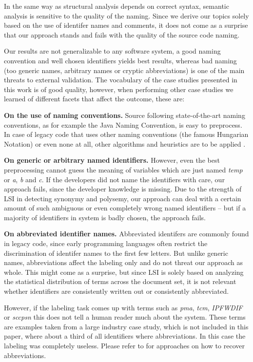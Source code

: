 In the same way as structural analysis depends on correct syntax, semantic analysis is sensitive to the quality of the naming. Since we derive our topics solely based on the use of identifer names and comments, it does not come as a surprise that our approach stands and fails with the quality of the source code naming.

Our results are not generalizable to any software system, a good naming convention and well chosen identifiers yields best results, whereas bad naming (\ie too generic names, arbitrary names or cryptic abbreviations) is one of the main threats to external validation. The vocabulary of the case studies presented in this work is of good quality, however, when performing other case studies we learned of different facets that affect the outcome, these are:

\textbf{On the use of naming conventions.} Source following state-of-the-art naming conventions, as for example the Java Naming Convention, is easy to preprocess. In case of legacy code that uses other naming conventions (\eg the famous Hungarian Notation) or even none at all, other algorithms and heuristics are to be applied \cite{Capr93a,Anqu98b}.

\textbf{On generic or arbitrary named identifiers.} However, even the best preprocessing cannot guess the meaning of variables which are just named \emph{temp} or \emph{a}, \emph{b} and \emph{c}. If the developers did not name the identifiers with care, our approach fails, since the developer knowledge is missing. Due to the strength of LSI in detecting synonymy and polysemy, our approach can deal with a certain amount of such ambiguous or even completely wrong named identifiers -- but if a majority of identifiers in system is badly chosen, the approach fails.

\textbf{On abbreviated identifier names.} Abbreviated identifers are commonly found in legacy code, since early programming languages often restrict the discrimination of identifer names to the first few letters. But unlike generic names, abbreviations affect the labeling only and do not threat our approach  as whole. This might come as a surprise, but since LSI is solely based on analyzing the statistical distribution of terms across the document set, it is not relevant whether identifiers are consistently written out or consistently abbreviated.

However, if the labeling task comes up with terms such as \emph{pma}, \emph{tcm}, \emph{IPFWDIF} or \emph{sccpsn} this does not tell a human reader much about the system. These terms are examples taken from a large industry case study, which is not included in this paper, where about a third of all identifiers where abbreviations. In this case the labeling was completely useless. Please refer to \cite{Anqu98b} for approaches on how to recover abbreviations.

